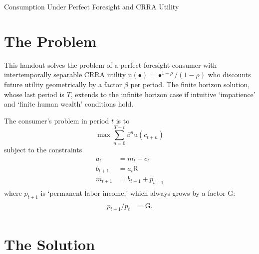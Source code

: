 \documentclass{scrartcl}
\begin{document}
\handoutHeader

{\centerline {\LARGE Consumption Under Perfect Foresight and CRRA Utility }}\vspace{0.15in}


\section{The Problem}

This handout solves the problem of a perfect foresight consumer with intertemporally separable CRRA utility
$\mathrm{u}(\bullet)= \bullet^{1-\rho}/(1-\rho)$ who discounts future utility
geometrically by a factor $\beta$ per period.  The finite horizon
solution, whose last period is $T$, extends to the infinite horizon case if 
intuitive `impatience' and `finite human wealth' conditions hold.

The consumer's problem in period $t$ is to
\begin{equation}
\max \sum_{n=0}^{T-t} \beta^{n} \mathrm{u}(\boldsymbol{\mathit{c}}_{t+n})                \label{eq:maxprob}
\end{equation}
subject to the constraints 
\begin{equation}\begin{gathered}\begin{aligned}
      \boldsymbol{\mathit{a}}_{t}   & =  \boldsymbol{\mathit{m}}_{t}-\boldsymbol{\mathit{c}}_{t}
\\    \boldsymbol{\mathit{b}}_{t+1} & =  \boldsymbol{\mathit{a}}_{t}\mathsf{R}
\\    \boldsymbol{\mathit{m}}_{t+1} & =  \boldsymbol{\mathit{b}}_{t+1}+\boldsymbol{\mathit{p}}_{t+1}
\end{aligned}\end{gathered}\end{equation}
where $\boldsymbol{\mathit{p}}_{t+1}$ is `permanent labor income,' which always grows by a factor $\ensuremath{\mathrm{G}}$:
\begin{equation}\begin{gathered}\begin{aligned}
        \boldsymbol{\mathit{p}}_{t+1}/\boldsymbol{\mathit{p}}_{t} & =  {\ensuremath{\mathrm{G}}}.
\end{aligned}\end{gathered}\end{equation}

\section{The Solution}
\end{document}

